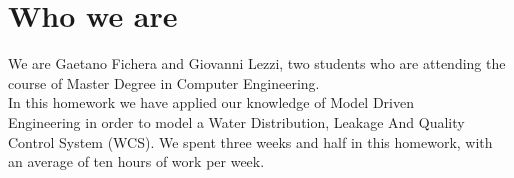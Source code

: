 \newpage \chapter{\textbf{Who we are}}
We are Gaetano Fichera and Giovanni Lezzi, two students who are attending the course of Master Degree in Computer Engineering.\\
In this homework we have applied our knowledge of Model Driven \\
Engineering in order to model a Water Distribution, Leakage And Quality Control System (WCS). We spent three weeks and half in this homework, with an average of ten hours of work per week.
